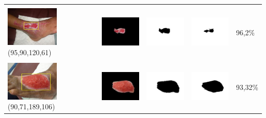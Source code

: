 \begin{table}[H]
\begin{tabular}{|m{1.0in}|m{1.0in}|m{1.0in}|m{1.0in}|m{0.6in}|}
		&  &  & \\
		\includegraphics[width=1.0in]{gambar/hasil_segmentasi/luka_merah/image_10_rect.jpg} {\centering\fontsize{10}{10}\selectfont(95,90,120,61)}&
		\includegraphics[width=1.0in]{gambar/hasil_segmentasi/luka_merah/result_10.jpg}&
		\includegraphics[width=1.0in]{gambar/hasil_segmentasi/luka_merah/mask_r_10.jpg}&
		\includegraphics[width=1.0in]{gambar/hasil_segmentasi/luka_merah/10_r.jpg}&
		96,2\% \\
		\hline

		&  &  & \\
		\includegraphics[width=1.0in]{gambar/hasil_segmentasi/luka_merah/image_11_rect.jpg} {\centering\fontsize{10}{10}\selectfont(90,71,189,106)}&
		\includegraphics[width=1.0in]{gambar/hasil_segmentasi/luka_merah/result_11.jpg}&
		\includegraphics[width=1.0in]{gambar/hasil_segmentasi/luka_merah/mask_r_11.jpg}&
		\includegraphics[width=1.0in]{gambar/hasil_segmentasi/luka_merah/11_r.jpg}&
		93,32\% \\
		\hline


\end{tabular}
\end{table}

